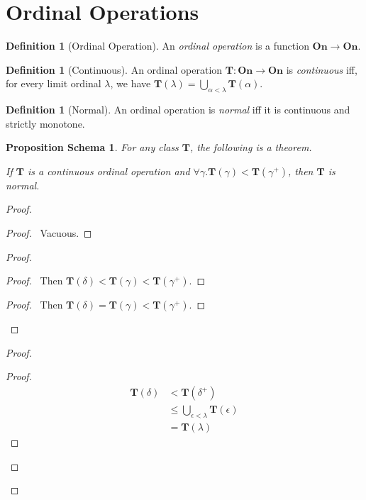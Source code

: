 \documentclass{book}
\let\qed\relax
\newtheorem{props}[ax]{Proposition Schema}
\theoremstyle{definition}
\newtheorem{df}[ax]{Definition}
\begin{document}
\section{Ordinal Operations}

\begin{df}[Ordinal Operation]
An \emph{ordinal operation} is a function $\mathbf{On} \rightarrow \mathbf{On}$.
\end{df}

\begin{df}[Continuous]
An ordinal operation $\mathbf{T} : \mathbf{On} \rightarrow \mathbf{On}$ is \emph{continuous} iff, for every limit ordinal $\lambda$, we have $\mathbf{T}(\lambda) = \bigcup_{\alpha < \lambda} \mathbf{T}(\alpha)$.
\end{df}

\begin{df}[Normal]
An ordinal operation is \emph{normal} iff it is continuous and strictly monotone.
\end{df}

\begin{props}
\label{prop:normal}
For any class $\mathbf{T}$, the following is a theorem.

If $\mathbf{T}$ is a continuous ordinal operation and $\forall \gamma. \mathbf{T}(\gamma) < \mathbf{T}(\gamma^+)$, then $\mathbf{T}$ is normal.
\end{props}

\begin{proof}
\pf
{}
\begin{proof}
	\pf\ Vacuous.
\end{proof}
\begin{proof}
	\begin{proof}
		\pf\ Then $\mathbf{T}(\delta) < \mathbf{T}(\gamma) < \mathbf{T}(\gamma^+)$.
	\end{proof}
	\begin{proof}
		\pf\ Then $\mathbf{T}(\delta) = \mathbf{T}(\gamma) < \mathbf{T}(\gamma^+)$.
	\end{proof}
\end{proof}
\begin{proof}
	\begin{proof}
		\pf
		\begin{align*}
			\mathbf{T}(\delta) & < \mathbf{T}(\delta^+) \\
			& \leq \bigcup_{\epsilon < \lambda} \mathbf{T}(\epsilon) \\
			& = \mathbf{T}(\lambda)
		\end{align*}
	\end{proof}
\end{proof}
\qed
\end{proof}
\end{document}
